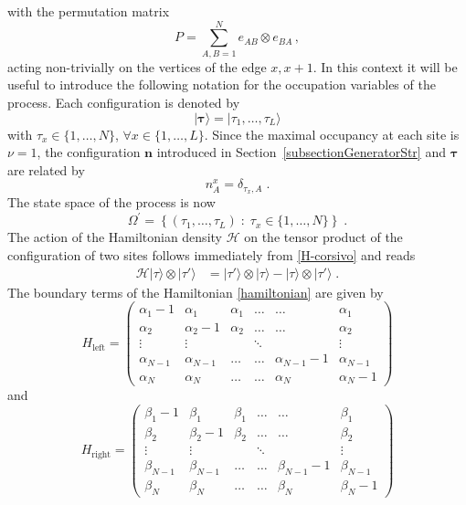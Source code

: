 \documentclass[10pt]{article}
\numberwithin{equation}{section}
\numberwithin{equation}{subsection}
\newcommand{\dt}{\;.}
\begin{document}
with the permutation matrix
\begin{equation}
	P=\sum_{A,B=1}^Ne_{AB}\otimes e_{BA}\,,
\end{equation} 
acting non-trivially on the vertices of the edge $x,x+1$.
 In this context it will be useful to introduce the following notation for the occupation variables of the process. Each configuration is denoted by
\begin{equation}\label{Tau-Notation}
	|\bm{\tau}\rangle=|\tau_{1},\ldots,\tau_{L}\rangle
\end{equation} 
with $\tau_{x}\in \{1,\ldots,N\}$, $\forall x\in \{1,\ldots,L\}$. Since the {maximal occupancy at each site is $\nu=1$},
the configuration $\bm{n}$ introduced in Section~\ref{subsectionGeneratorStr} and $\bm{\tau}$ are related by 
\begin{equation}\label{notation-change-relation}
	n_{A}^{x}=\delta_{\tau_{x},A}\dt
\end{equation}
The state space of the process is now 
\begin{equation}
	\Omega^{'}=\left\{(\tau_{1},\ldots,\tau_{L})\;:\; \tau_{x}\in\{1,\ldots,N\}\right\}\dt
\end{equation}
The action of the Hamiltonian density $\mathcal{H}$ on the tensor product of the configuration of two sites follows immediately from \eqref{H-corsivo} and reads
\begin{equation}
	\begin{split}
		\mathcal{H}| \tau\rangle\otimes   |\tau'\rangle&=|\tau'\rangle \otimes |\tau\rangle-|\tau\rangle \otimes|\tau'\rangle\dt
	\end{split}
\end{equation}
The boundary terms of the Hamiltonian \eqref{hamiltonian}  are given by 
\begin{equation}
	H_{\text{left}}=\begin{pmatrix}
		\alpha_{1}-1&\alpha_{1}&\alpha_{1}&\ldots&\ldots&\alpha_{1}\\
		\alpha_{2}&\alpha_{2}-1&\alpha_{2}&\ldots&\ldots&\alpha_{2}\\
		\vdots&\vdots& &\ddots& &\vdots\\
		\alpha_{N-1}&\alpha_{N-1}&\ldots&\ldots&\alpha_{N-1}-1&\alpha_{N-1}\\
		\alpha_{N}&\alpha_{N}&\ldots&\ldots&\alpha_{N}&\alpha_{N}-1
	\end{pmatrix}
\end{equation}
and 
\begin{equation}
	H_{\text{right}}=\begin{pmatrix}
		\beta_{1}-1&\beta_{1}&\beta_{1}&\ldots&\ldots&\beta_{1}\\
		\beta_{2}&\beta_{2}-1&\beta_{2}&\ldots&\ldots&\beta_{2}\\
		\vdots&\vdots& &\ddots& &\vdots\\
		\beta_{N-1}&\beta_{N-1}&\ldots&\ldots&\beta_{N-1}-1&\beta_{N-1}\\
		\beta_{N}&\beta_{N}&\ldots&\ldots&\beta_{N}&\beta_{N}-1
	\end{pmatrix}
\end{equation}
\end{document}
